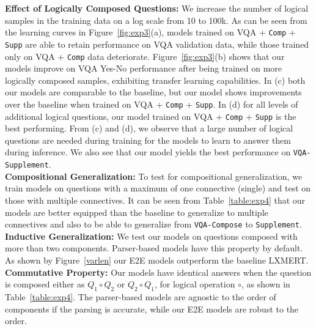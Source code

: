         \noindent\textbf{Effect of Logically Composed Questions:}
        We increase the number of logical samples in the training data on a log scale from 10 to 100k.
        As can be seen from the learning curves in Figure~\ref{fig:exp3}(a), models trained on VQA + \texttt{Comp} + \texttt{Supp} are able to retain performance on VQA validation data, while those trained only on VQA + \texttt{Comp} data deteriorate.
        Figure~\ref{fig:exp3}(b) shows that our models improve on VQA Yes-No performance after being trained on more logically composed samples, exhibiting transfer learning capabilities.
        In (c) both our models are comparable to the baseline, but our model shows improvements over the baseline when trained on VQA + \texttt{Comp} + \texttt{Supp}.
        In (d) for all levels of additional logical questions, our model trained on VQA + \texttt{Comp} + \texttt{Supp} is the best performing.
        From (c) and (d), we observe that a large number of logical questions are needed during training for the models to learn to answer them during inference.
        We also see that our model yields the best performance on \texttt{VQA-Supplement}.\\
        
        \noindent\textbf{Compositional Generalization:}
        To test for compositional generalization, we train models on questions with a maximum of one connective (single) and test on those with multiple connectives.
        It can be seen from Table~\ref{table:exp4} that our models are better equipped than the baseline to generalize to multiple connectives and also to be able to generalize from \texttt{VQA-Compose} to \texttt{Supplement}.\\
        
        
        
        \noindent\textbf{Inductive Generalization:}
        We test our models on questions composed with more than two components. Parser-based  models have this property by default.
        As shown by Figure~\ref{varlen} our E2E models outperform the baseline LXMERT.\\

        \noindent\textbf{Commutative Property:}
        Our models have identical answers when the question is composed either as $Q_1\circ Q_2$ or $Q_2\circ Q_1$, for logical operation $\circ$, as shown in Table~\ref{table:exp4}.
        The parser-based models are agnostic to the order of components if the parsing is accurate, while our E2E models are robust to the order.\\

